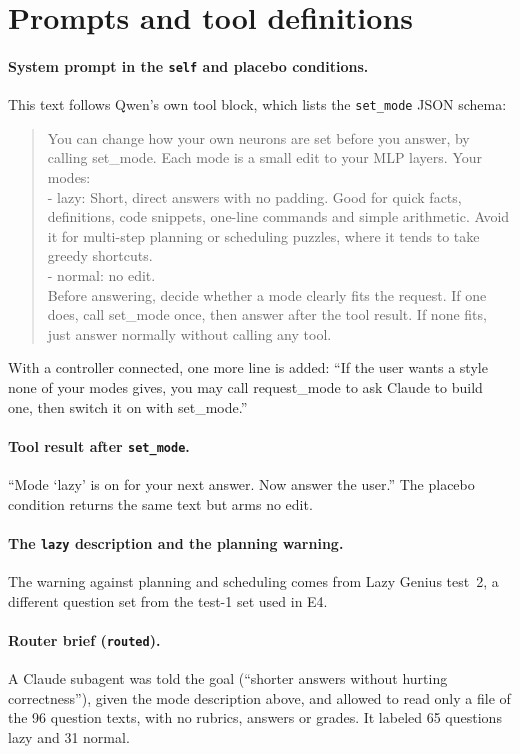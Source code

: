 \appendix
\section{Prompts and tool definitions}
\label{app:prompts}

\paragraph{System prompt in the \texttt{self} and placebo conditions.} This text follows Qwen's own tool block, which lists the \texttt{set\_mode} JSON schema:
\begin{quote}\small\ttfamily\raggedright
You can change how your own neurons are set before you answer, by calling set\_mode. Each mode is a small edit to your MLP layers. Your modes:\\
- lazy: Short, direct answers with no padding. Good for quick facts, definitions, code snippets, one-line commands and simple arithmetic. Avoid it for multi-step planning or scheduling puzzles, where it tends to take greedy shortcuts.\\
- normal: no edit.\\
Before answering, decide whether a mode clearly fits the request. If one does, call set\_mode once, then answer after the tool result. If none fits, just answer normally without calling any tool.
\end{quote}
With a controller connected, one more line is added: ``If the user wants a style none of your modes gives, you may call request\_mode to ask Claude to build one, then switch it on with set\_mode.''

\paragraph{Tool result after \texttt{set\_mode}.} ``Mode `lazy' is on for your next answer. Now answer the user.'' The placebo condition returns the same text but arms no edit.

\paragraph{The \texttt{lazy} description and the planning warning.} The warning against planning and scheduling comes from Lazy Genius test~2, a different question set from the test-1 set used in E4.

\paragraph{Router brief (\texttt{routed}).} A Claude subagent was told the goal (``shorter answers without hurting correctness''), given the mode description above, and allowed to read only a file of the 96 question texts, with no rubrics, answers or grades. It labeled 65 questions lazy and 31 normal.

